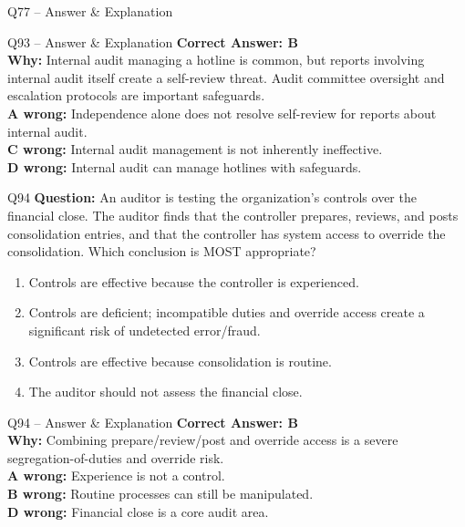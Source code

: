 \documentclass[aspectratio=169,10pt]{beamer}
\begin{document}
\begin{frame}[t]{Q77 -- Answer \& Explanation}
	\begin{frame}[t]{Q93 -- Answer \& Explanation}
		\small
		\textbf{Correct Answer: B} \\[4pt]
		\textbf{Why:} Internal audit managing a hotline is common, but reports involving internal audit itself create a self-review threat. Audit committee oversight and escalation protocols are important safeguards. \\[4pt]
		\textbf{A wrong:} Independence alone does not resolve self-review for reports about internal audit. \\[2pt]
		\textbf{C wrong:} Internal audit management is not inherently ineffective. \\[2pt]
		\textbf{D wrong:} Internal audit can manage hotlines with safeguards.
	\end{frame}
	
	\begin{frame}[t]{Q94}
		\small
		\textbf{Question:} An auditor is testing the organization's controls over the financial close. The auditor finds that the controller prepares, reviews, and posts consolidation entries, and that the controller has system access to override the consolidation. Which conclusion is MOST appropriate?
		\begin{enumerate}[label=\Alph*.,itemsep=1pt,topsep=2pt]
			\item Controls are effective because the controller is experienced.
			\item Controls are deficient; incompatible duties and override access create a significant risk of undetected error/fraud.
			\item Controls are effective because consolidation is routine.
			\item The auditor should not assess the financial close.
		\end{enumerate}
	\end{frame}
	
	\begin{frame}[t]{Q94 -- Answer \& Explanation}
		\small
		\textbf{Correct Answer: B} \\[4pt]
		\textbf{Why:} Combining prepare/review/post and override access is a severe segregation-of-duties and override risk. \\[4pt]
		\textbf{A wrong:} Experience is not a control. \\[2pt]
		\textbf{B wrong:} Routine processes can still be manipulated. \\[2pt]
		\textbf{D wrong:} Financial close is a core audit area.
	\end{frame}
	

\end{frame}
\end{document}
